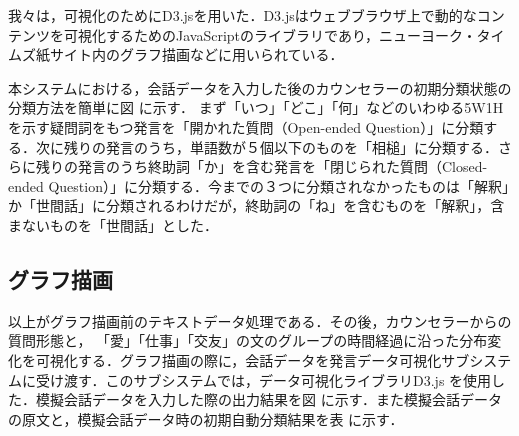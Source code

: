 \documentclass[shuuron]{kuee}
\begin{document}

我々は，可視化のためにD3.js\cite{vand3}を用いた．D3.jsはウェブブラウザ上で動的なコンテンツを可視化するためのJavaScriptのライブラリであり，ニューヨーク・タイムズ紙サイト内のグラフ描画などに用いられている．



本システムにおける，会話データを入力した後のカウンセラーの初期分類状態の分類方法を簡単に図
に示す．
まず「いつ」「どこ」「何」などのいわゆる5W1Hを示す疑問詞をもつ発言を「開かれた質問（Open-ended Question）」に分類する．次に残りの発言のうち，単語数が５個以下のものを「相槌」に分類する．さらに残りの発言のうち終助詞「か」を含む発言を「閉じられた質問（Closed-ended Question）」に分類する．今までの３つに分類されなかったものは「解釈」か「世間話」に分類されるわけだが，終助詞の「ね」を含むものを「解釈」，含まないものを「世間話」とした．

\subsection{グラフ描画}
以上がグラフ描画前のテキストデータ処理である．その後，カウンセラーからの質問形態と， 「愛」「仕事」「交友」の文のグループの時間経過に沿った分布変化を可視化する．グラフ描画の際に，会話データを発言データ可視化サブシステムに受け渡す．このサブシステムでは，データ可視化ライブラリD3.js
を使用した．模擬会話データを入力した際の出力結果を図
に示す．また模擬会話データの原文と，模擬会話データ時の初期自動分類結果を表
に示す．
%
\end{document}
